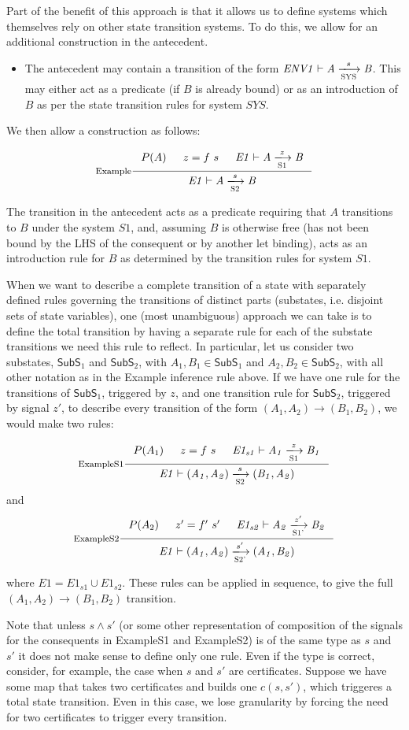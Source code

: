 \documentclass[11pt,a4paper]{article}
\newcommand{\var}[1]{\mathit{#1}}
\newcommand{\type}[1]{\mathsf{#1}}
\newcommand{\SubSone}{\type{SubS}_1}
\newcommand{\SubStwo}{\type{SubS}_2}
\theoremstyle{definition}
\theoremstyle{remark}
\begin{document}
Part of the benefit of this approach is that it allows us to define systems
which themselves rely on other state transition systems. To do this, we allow
for an additional construction in the antecedent.

\begin{itemize}
\item The antecedent may contain a transition of the form $\tion[ENV1]{SYS}{A}{s}{B}$.
    This may either act as a predicate (if $B$ is already bound) or as an
    introduction of $B$ as per the state transition rules for system $\var{SYS}$.
\end{itemize}

We then allow a construction as follows:

\[
  \inference[Example]
    {P(A) & z = f ~ s & \tion[E1]{S1}{A}{z}{B}}
    {\tion[E1]{S2}{A}{s}{B}}
\]

The transition in the antecedent acts as a predicate requiring that $A$
transitions to $B$ under the system $S1$, and, assuming $B$ is otherwise free
(has not been bound by the LHS of the consequent or by another let binding),
acts as an introduction rule for $B$ as determined by the transition rules for
system $S1$.

When we want to describe a complete transition of a state with separately
defined rules governing the transitions of distinct parts (substates, i.e.
disjoint sets of state variables), one (most
unambiguous) approach we can take is to define the total transition
by having a separate rule for each of the substate transitions we need this
rule to reflect. In particular, let us consider two substates, $\SubSone$ and
$\SubStwo$, with $A_1, B_1 \in \SubSone$ and $A_2, B_2 \in \SubStwo$, with all other
notation as in the Example inference rule above. If we have one rule for
the transitions of $\SubSone$, triggered by $z$, and one transition rule for $\SubStwo$,
triggered by signal $z'$, to describe every transition
of the form  $(A_1, A_2) \to (B_1, B_2)$,  we would make two rules:

\[
  \inference[ExampleS1]
    {P(A_1) & z = f ~ s & \tion[E1_{s1}]{S1}{A_1}{z}{B_1}}
    {\tion[E1]{S2}{(A_1,A_2)}{s}{(B_1,A_2)}}
\]
and
\[
  \inference[ExampleS2]
    {P(A_2) & z' = f' ~ s' & \tion[E1_{s2}]{S1'}{A_2}{z'}{B_2}}
    {\tion[E1]{S2'}{(A_1,A_2)}{s'}{(A_1,B_2)}}
\]

\noindent where $E1 = E1_{s1} \cup E1_{s2}$. These rules can be applied in sequence,
to give the full $(A_1, A_2) \to (B_1, B_2)$ transition.

Note that unless $s \wedge s'$ (or some other representation of composition
of the signals for the consequents in ExampleS1 and ExampleS2) is of the
same type as $s$ and $s'$
it does not make sense to define only one rule.
Even if the type is correct, consider, for example, the case when
$s$ and $s'$ are certificates. Suppose we have some map that takes two
certificates and builds one $c(s, s')$, which triggeres a total state transition.
Even in this case, we lose granularity by forcing the need for two certificates
to trigger every transition.
\end{document}
